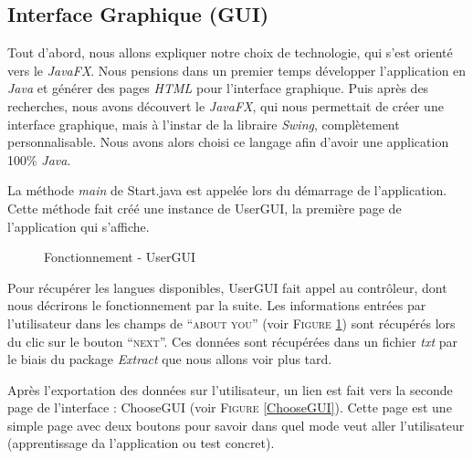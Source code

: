 \subsection{Interface Graphique (GUI)}\label{GUI}

Tout d'abord, nous allons expliquer notre choix de technologie, qui s'est orienté vers le \textit{JavaFX}.
Nous pensions dans un premier temps développer l'application en \textit{Java} et générer des pages \textit{HTML} pour l'interface graphique. Puis après des recherches, nous avons découvert le \textit{JavaFX}, qui nous permettait de créer une interface graphique, mais à l'instar de la libraire \textit{Swing}, complètement personnalisable. Nous avons alors choisi ce langage afin d'avoir une application 100\% \textit{Java}.


La méthode \textit{main} de Start.java est appelée lors du démarrage de l'application. Cette méthode fait créé une instance de UserGUI, la première page de l'application qui s'affiche.

\begin{figure}[!ht]
\begin{center}
  \caption{Fonctionnement - UserGUI}
  \label{UserGUI} 
\end{center}
\end{figure}

Pour récupérer les langues disponibles, UserGUI fait appel au contrôleur, dont nous décrirons le fonctionnement par la suite.
Les informations entrées par l'utilisateur dans les champs de ``\textsc{about you}'' (voir \textsc{Figure} \ref{UserGUI}) sont récupérés lors du clic sur le bouton ``\textsc{next}''. Ces données sont récupérées dans un fichier \textit{txt} par le biais du package \textit{Extract} que nous allons voir plus tard.

Après l'exportation des données sur l'utilisateur, un lien est fait vers la seconde page de l'interface : ChooseGUI (voir \textsc{Figure} \ref{ChooseGUI}). Cette page est une simple page avec deux boutons pour savoir dans quel mode veut aller l'utilisateur (apprentissage da l'application ou test concret).


